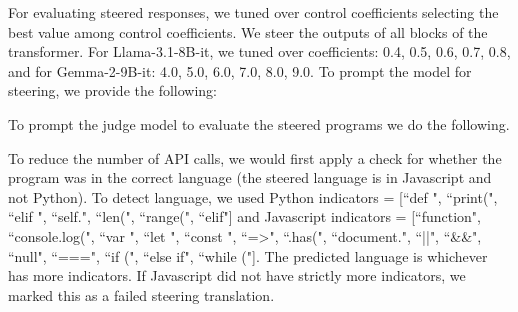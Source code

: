 \begin{center}
\end{center}


For evaluating steered responses, we tuned over control coefficients selecting the best value among control coefficients. We steer the outputs of all blocks of the transformer. For Llama-3.1-8B-it, we tuned over coefficients: 0.4, 0.5, 0.6, 0.7, 0.8, and for Gemma-2-9B-it: 4.0, 5.0, 6.0, 7.0, 8.0, 9.0. To prompt the model for steering, we provide the following:
\begin{center}
\end{center}
To prompt the judge model to evaluate the steered programs we do the following. 
\begin{center}
\end{center}
To reduce the number of API calls, we would first apply a check for whether the program was in the correct language (the steered language is in Javascript and not Python). To detect language, we used Python indicators = [``def ", ``print(", ``elif ", ``self.", ``len(", ``range(", ``elif"] and 
Javascript indicators = [``function", ``console.log(", ``var ", ``let ", ``const ", ``=>", ``.has(", ``document.", ``||", ``\&\&", ``null", ``===", ``if (", ``else if", ``while ("]. The predicted language is whichever has more indicators. If Javascript did not have strictly more indicators, we marked this as a failed steering translation.


